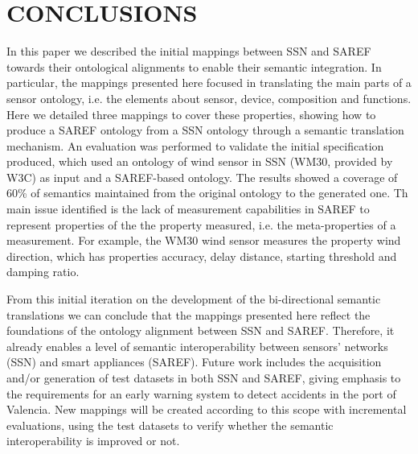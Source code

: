 \documentclass{sig-alternate-05-2015}
\begin{document}
\section{CONCLUSIONS}

In this paper we described the initial mappings between SSN and SAREF towards their ontological alignments to enable their semantic integration. In particular, the mappings presented here focused in translating the main parts of a sensor ontology, i.e. the elements about sensor, device, composition and functions. Here we detailed three mappings to cover these properties, showing how to produce a SAREF ontology from a SSN ontology through a semantic translation mechanism. An evaluation was performed to validate the initial specification produced, which used an ontology of wind sensor in SSN (WM30, provided by W3C) as input and a SAREF-based ontology. The results showed a coverage of 60\% of semantics maintained from the original ontology to the generated one. Th main issue identified is the lack of measurement capabilities in SAREF to represent properties of the the property measured, i.e. the meta-properties of a measurement. For example, the WM30 wind sensor measures the property wind direction, which has properties accuracy, delay distance, starting threshold and damping ratio. 

From this initial iteration on the development of the bi-directional semantic translations we can conclude that the mappings presented here reflect the foundations of the ontology alignment between SSN and SAREF. Therefore, it already enables a level of semantic interoperability between sensors' networks (SSN) and smart appliances (SAREF). Future work includes the acquisition and/or generation of test datasets in both SSN and SAREF, giving emphasis to the requirements for an early warning system \cite{Moreira2017} to detect accidents in the port of Valencia. New mappings will be created according to this scope with incremental evaluations, using the test datasets to verify whether the semantic interoperability is improved or not.  



%

%
%
\end{document}
